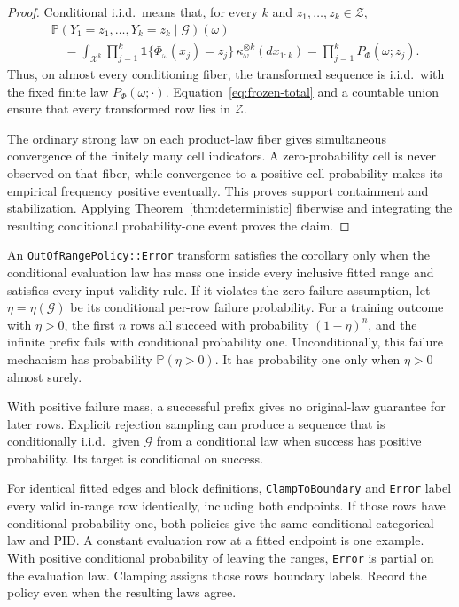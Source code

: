 \documentclass[11pt]{article}
\theoremstyle{definition}
\newcommand{\cZ}{\mathcal{Z}}
\newcommand{\Prb}{\mathbb{P}}
\newcommand{\Ind}{\mathbf{1}}
\begin{document}
\begin{proof}
Conditional i.i.d.\ means that, for every $k$ and $z_1,\ldots,z_k\in\cZ$,
\begin{align}
 &\Prb(Y_1=z_1,\ldots,Y_k=z_k\mid\mathcal G)(\omega)\\
 &\quad=
 \int_{\mathcal X^k}
   \prod_{j=1}^{k}\Ind\{\Phi_\omega(x_j)=z_j\}\,
   \kappa_\omega^{\otimes k}(dx_{1:k})
 =\prod_{j=1}^{k}P_\Phi(\omega;z_j).
\end{align}
Thus, on almost every conditioning fiber, the transformed sequence is i.i.d.\ with the fixed
finite law $P_\Phi(\omega;\cdot)$.  Equation~\eqref{eq:frozen-total} and a countable union ensure
that every transformed row lies in $\cZ$.

The ordinary strong law on each product-law fiber gives simultaneous convergence of the finitely
many cell indicators.  A zero-probability cell is never observed on that fiber, while convergence
to a positive cell probability makes its empirical frequency positive eventually.  This proves
support containment and stabilization.  Applying Theorem~\ref{thm:deterministic} fiberwise and
integrating the resulting conditional probability-one event proves the claim.
\end{proof}

	An \nolinkurl{OutOfRangePolicy::Error} transform satisfies the corollary only when the
	conditional evaluation law has mass one inside every inclusive fitted range and satisfies every
	input-validity rule.  If it violates the zero-failure assumption, let
	$\eta=\eta(\mathcal{G})$ be its conditional per-row failure probability.  For a training outcome
	with $\eta>0$, the first $n$ rows all succeed with probability
	$(1-\eta)^n$, and the infinite prefix fails with conditional probability one.  Unconditionally,
	this failure mechanism has probability $\Prb(\eta>0)$.  It has probability one only when
	$\eta>0$ almost surely.

With positive failure mass, a successful prefix gives no original-law guarantee for later rows.  Explicit
rejection sampling can produce a sequence that is conditionally i.i.d.\ given $\mathcal{G}$ from a
conditional law when success has positive probability.  Its target is conditional on success.

For identical fitted edges and block definitions, \nolinkurl{ClampToBoundary} and
\nolinkurl{Error} label every valid in-range row identically, including both endpoints.
If those rows have conditional probability one, both policies give the same conditional
categorical law and PID\@.  A constant evaluation row at a fitted endpoint is one example.
With positive conditional probability of leaving the ranges, \nolinkurl{Error} is partial on
the evaluation law.  Clamping assigns those rows boundary labels.  Record the policy even
when the resulting laws agree.
\end{document}
